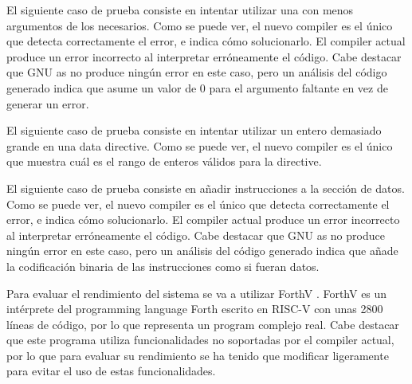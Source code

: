 \evalres

El siguiente caso de prueba consiste en intentar utilizar una
 con menos argumentos de los necesarios.
\evalresref Como se puede ver, el nuevo \gls{compiler} es el único que detecta
correctamente el error, e indica cómo solucionarlo. El \gls{compiler} actual
produce un error incorrecto al interpretar erróneamente el código. Cabe destacar
que GNU as no produce ningún error en este caso, pero un análisis del código
generado indica que asume un valor de 0 para el argumento faltante en vez de
generar un error.

\evalres

El siguiente caso de prueba consiste en intentar utilizar un entero demasiado
grande en una \gls{data directive}. \evalresref Como se puede ver, el nuevo
\gls{compiler} es el único que muestra cuál es el rango de enteros válidos para
la \gls{directive}.

\evalres

El siguiente caso de prueba consiste en añadir instrucciones a la sección de
datos. \evalresref Como se puede ver, el nuevo \gls{compiler} es el único que
detecta correctamente el error, e indica cómo solucionarlo. El \gls{compiler}
actual produce un error incorrecto al interpretar erróneamente el código. Cabe
destacar que GNU as no produce ningún error en este caso, pero un análisis del
código generado indica que añade la codificación binaria de las instrucciones
como si fueran datos.

\evalres


Para evaluar el rendimiento del sistema se va a utilizar ForthV
\parencite{ForthV}. ForthV es un intérprete del \gls{programming language} Forth
escrito en  RISC-V \parencite{RISC-V} con unas
2800 líneas de código, por lo que representa un \gls{program} complejo real.
Cabe destacar que este programa utiliza funcionalidades no soportadas por el
\gls{compiler} actual, por lo que para evaluar su rendimiento se ha tenido que
modificar ligeramente para evitar el uso de estas funcionalidades.
